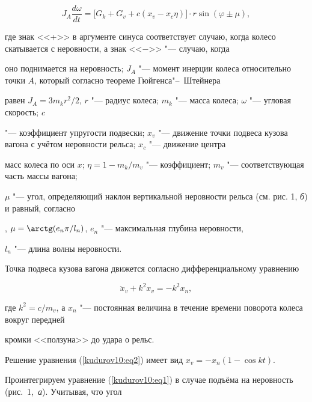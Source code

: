 \begin{equation}

\label{kudurov10:eq1}

J_A \frac{d \omega}{dt}=\bigl[ G_k +G_v + c\left( x_v -x_c \eta  \right) \bigr]\cdot r\sin ( \varphi

\pm \mu),

\end{equation}

где знак <<+>> в аргументе синуса соответствует случаю, когда колесо скатывается с неровности, а знак <<$-$>> "--- случаю, когда

оно поднимается на неровность; $J_A$ "--- момент инерции колеса относительно точки $A$, который согласно теореме Гюйгенса"--~Штейнера

равен $J_A = {3}m_k r^2/2$, $r$ "--- радиус колеса; $m_k$ "--- масса колеса; $\omega $ "--- угловая скорость; $c$

"--- коэффициент упругости подвески; $x_v$ "--- движение точки подвеса кузова вагона с учётом неровности рельса; $x_c$ "--- движение центра

масс колеса по оси $x$; $\eta =1-{m_k}/{m_v}$ "--- коэффициент; $m_v$ "--- соответствующая часть массы вагона;

$\mu $ "--- угол, определяющий наклон вертикальной неровности рельса (см. рис. 1, \textsl{б}) и равный, согласно

\cite{kudurov10:kudurov08}, $\mu =\arctg( {e_n}\pi /{l_n } )$, $e_n $ "--- максимальная глубина неровности,

$l_n $ "--- длина волны неровности.



Точка подвеса кузова вагона движется согласно дифференциальному уравнению

\begin{equation}

\label{kudurov10:eq2} \ddot {x}_v + k^2x_v =-k^2x_n,

\end{equation}

где $k^2 = {c}/{m_v}$, а $x_n $ "--- постоянная величина в течение времени поворота колеса вокруг передней

кромки <<ползуна>> до удара о рельс.



Решение уравнения (\ref{kudurov10:eq2}) имеет вид $x_v =-x_n (1-\cos kt)$.



Проинтегрируем уравнение (\ref{kudurov10:eq1}) в случае подъёма на неровность (рис.~1,~\textsl{а}). Учитывая, что угол

